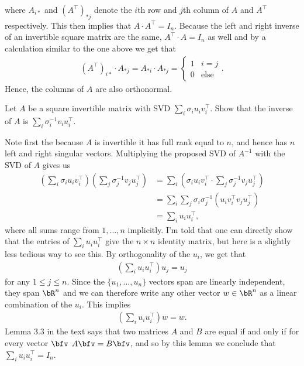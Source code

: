 \begin{homework}[e]
\begin{prf}
    where $A_{i*}$ and $(A^\top)_{*j}$ denote the $i$th row and $j$th column of $A$ and $A^\top$ respectively. This then implies that $A\cdot A^\top = I_n$. Because the left and right inverse of an invertible square matrix are the same, $A^\top \cdot A = I_n$ as well and by a calculation similar to the one above we get that 
    \begin{align*}
      (A^\top)_{i*}\cdot A_{*j} = A_{*i}\cdot A_{*j} =
      \begin{cases}
        1 & i = j \\
        0 & \text{else}
      \end{cases}.
    \end{align*}
    Hence, the columns of $A$ are also orthonormal.
  \end{prf}
  \prob Let $A$ be a square invertible matrix with SVD $\sum_i \sigma_i u_i v_i^\top$. Show that the inverse of $A$ is $\sum_i \sigma_i^{-1}v_i u_i^\top$.
  \begin{prf}
    Note first the because $A$ is invertible it has full rank equal to $n$, and hence has $n$ left and right singular vectors. Multiplying the proposed SVD of $A^{-1}$ with the SVD of $A$ gives us
    \begin{align*}
      \left(\sum_i \sigma_i u_i v_i^\top\right)\left(\sum_j \sigma_j^{-1}v_j u_j^\top\right) 
      &= \sum_i \left(\sigma_i u_iv_i^\top\cdot \sum_j\sigma^{-1}_jv_ju_j^{\top}\right)\\
      &= \sum_i\sum_j \sigma_i\sigma_j^{-1}(u_iv_i^\top v_ju_j^\top) \\
      &= \sum_i u_iu_i^{\top},
    \end{align*}
  where all sums range from $1,...,n$ implicitly. I'm told that one can directly show that the entries of $\sum_i u_iu_i^{\top}$ give the $n\times n$ identity matrix, but here is a slightly less tedious way to see this. By orthogonality of the $u_i$, we get that
  \begin{align*}
    \left(\sum_i u_iu_i^{\top}\right) u_j = u_j
  \end{align*}
  for any $1\leq j \leq n$. Since the $\{u_1,...,u_n\}$ vectors span are linearly independent, they span $\bR^n$ and we can therefore write any other vector $w \in \bR^n$ as a linear combination of the $u_i$. This implies
  \begin{align*}
    \left(\sum_i u_iu_i^{\top}\right) w = w.
  \end{align*}
  Lemma 3.3 in the text says that two matrices $A$ and $B$ are equal if and only if for every vector $\bfv$ $A\bfv = B\bfv$, and so by this lemma we conclude that $\sum_i u_iu_i^{\top} = I_n$.


\end{prf}
\end{homework}
